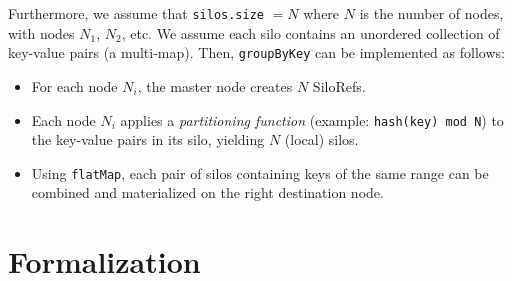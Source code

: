 \documentclass[preprint]{sigplanconf}
\theoremstyle{definition}
\theoremstyle{definition}
\begin{document}
Furthermore, we assume that \verb|silos.size| $= N$ where $N$ is the number of
nodes, with nodes $N_1$, $N_2$, etc. We assume each silo contains an unordered
collection of key-value pairs (a multi-map). Then, \verb|groupByKey| can be
implemented as follows:

\begin{itemize}
\item For each node $N_i$, the master node creates $N$ SiloRefs.

\item Each node $N_i$ applies a {\em partitioning function}
(example: \texttt{hash(key) mod N}) to the key-value pairs in its silo,
yielding $N$ (local) silos.

\item Using \verb|flatMap|, each pair of silos containing keys of the
same range can be combined and materialized on the right destination node.
\end{itemize}


\section{Formalization}
\label{sec:formalization}
\end{document}
